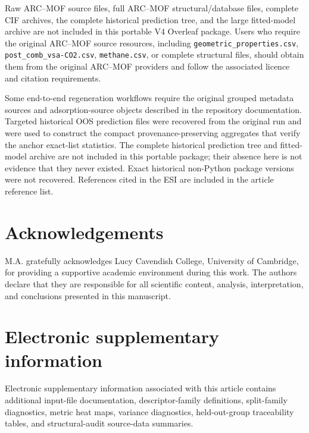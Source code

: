 \documentclass[11pt,a4paper]{article}
\begin{document}
Raw ARC--MOF source files, full ARC--MOF structural/database files, complete CIF archives, the complete historical prediction tree, and the large fitted-model archive are not included in this portable V4 Overleaf package. Users who require the original ARC--MOF source resources, including \texttt{geometric\_properties.csv}, \texttt{post\_comb\_vsa-CO2.csv}, \texttt{methane.csv}, or complete structural files, should obtain them from the original ARC--MOF providers and follow the associated licence and citation requirements.

Some end-to-end regeneration workflows require the original grouped metadata sources and adsorption-source objects described in the repository documentation. Targeted historical OOS prediction files were recovered from the original run and were used to construct the compact provenance-preserving aggregates that verify the anchor exact-list statistics. The complete historical prediction tree and fitted-model archive are not included in this portable package; their absence here is not evidence that they never existed. Exact historical non-Python package versions were not recovered. References cited in the ESI are included in the article reference list.

\section*{Acknowledgements}
M.A. gratefully acknowledges Lucy Cavendish College, University of Cambridge, for providing a supportive academic environment during this work. The authors declare that they are responsible for all scientific content, analysis, interpretation, and conclusions presented in this manuscript.

\section*{Electronic supplementary information}
Electronic supplementary information associated with this article contains additional input-file documentation, descriptor-family definitions, split-family diagnostics, metric heat maps, variance diagnostics, held-out-group traceability tables, and structural-audit source-data summaries.




\end{document}
